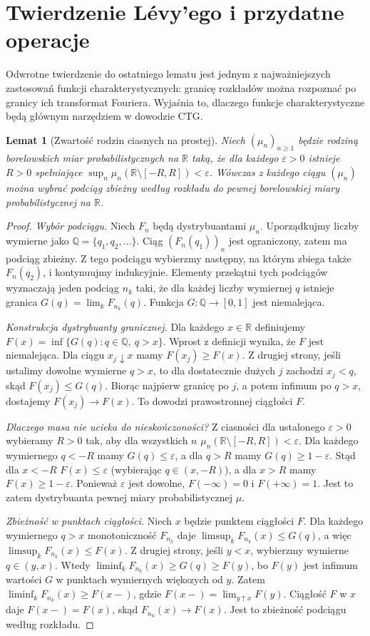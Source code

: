 \documentclass[11pt,a4paper,oneside]{report}
\numberwithin{equation}{chapter}
\theoremstyle{plain}
\newtheorem{lemat}[twierdzenie]{Lemat}
\theoremstyle{definition}
\theoremstyle{remark}
\newcommand{\R}{\mathbb{R}}
\begin{document}
\section{Twierdzenie Lévy'ego i przydatne operacje}

Odwrotne twierdzenie do ostatniego lematu jest jednym
z najważniejszych zastosowań funkcji charakterystycznych:
granicę rozkładów można rozpoznać po granicy ich
transformat Fouriera. Wyjaśnia to, dlaczego funkcje
charakterystyczne będą głównym narzędziem w dowodzie CTG.

\begin{lemat}[Zwartość rodzin ciasnych na prostej]
Niech $(\mu_n)_{n\geq1}$ będzie rodziną borelowskich miar
probabilistycznych na $\R$ taką, że dla każdego
$\varepsilon>0$ istnieje $R>0$ spełniające
$\sup_n\mu_n(\R\setminus[-R,R])<\varepsilon$.
Wówczas z każdego ciągu $(\mu_n)$ można wybrać
podciąg zbieżny według rozkładu do pewnej borelowskiej
miary probabilistycznej na $\R$.
\end{lemat}
\begin{proof}
\emph{Wybór podciągu.} Niech $F_n$ będą dystrybuantami
$\mu_n$. Uporządkujmy liczby wymierne jako
$\mathbb Q=\{q_1,q_2,\ldots\}$. Ciąg
$(F_n(q_1))_n$ jest ograniczony, zatem ma podciąg
zbieżny. Z tego podciągu wybierzmy następny, na którym
zbiega także $F_n(q_2)$, i kontynuujmy indukcyjnie.
Elementy przekątni tych podciągów wyznaczają jeden
podciąg $n_k$ taki, że dla każdej liczby wymiernej
$q$ istnieje granica $G(q)=\lim_kF_{n_k}(q)$.
Funkcja $G:\mathbb Q\to[0,1]$ jest niemalejąca.

\emph{Konstrukcja dystrybuanty granicznej.}
Dla każdego $x\in\R$ definiujemy
$F(x)=\inf\{G(q):q\in\mathbb Q,\ q>x\}$.
Wprost z definicji wynika, że $F$ jest niemalejąca.
Dla ciągu $x_j\downarrow x$ mamy $F(x_j)\geq F(x)$.
Z drugiej strony, jeśli ustalimy dowolne wymierne
$q>x$, to dla dostatecznie dużych $j$ zachodzi
$x_j<q$, skąd $F(x_j)\leq G(q)$. Biorąc najpierw
granicę po $j$, a potem infimum po $q>x$,
dostajemy $F(x_j)\to F(x)$. To dowodzi
prawostronnej ciągłości $F$.

\emph{Dlaczego masa nie ucieka do nieskończoności?}
Z ciasności dla ustalonego $\varepsilon>0$
wybieramy $R>0$ tak, aby dla wszystkich $n$
$\mu_n(\R\setminus[-R,R])<\varepsilon$.
Dla każdego wymiernego $q<-R$ mamy
$G(q)\leq\varepsilon$, a dla $q>R$ mamy
$G(q)\geq1-\varepsilon$. Stąd dla $x<-R$
$F(x)\leq\varepsilon$ (wybierając $q\in(x,-R)$),
a dla $x>R$ mamy $F(x)\geq1-\varepsilon$.
Ponieważ $\varepsilon$ jest dowolne,
$F(-\infty)=0$ i $F(+\infty)=1$.
Jest to zatem dystrybuanta pewnej miary
probabilistycznej $\mu$.

\emph{Zbieżność w punktach ciągłości.}
Niech $x$ będzie punktem ciągłości $F$.
Dla każdego wymiernego $q>x$ monotoniczność
$F_{n_k}$ daje
$\limsup_kF_{n_k}(x)\leq G(q)$, a więc
$\limsup_kF_{n_k}(x)\leq F(x)$.
Z drugiej strony, jeśli $y<x$, wybierzmy
wymierne $q\in(y,x)$. Wtedy
$\liminf_kF_{n_k}(x)\geq G(q)\geq F(y)$,
bo $F(y)$ jest infimum wartości $G$ w punktach
wymiernych większych od $y$. Zatem
$\liminf_kF_{n_k}(x)\geq F(x-)$, gdzie
$F(x-)=\lim_{y\uparrow x}F(y)$.
Ciągłość $F$ w $x$ daje $F(x-)=F(x)$, skąd
$F_{n_k}(x)\to F(x)$. Jest to zbieżność
podciągu według rozkładu.
\end{proof}
\end{document}
